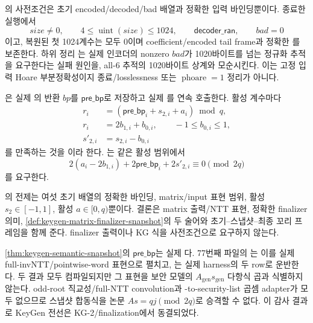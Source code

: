 \begin{verified}
\label{thm:fixed-zero-hbz-success}
의 사전조건은 초기
encoded/decoded/bad 배열과 정확한
 입력 바인딩뿐이다. 종료한 실행에서
\[
  size\ne0,\qquad 4\le\operatorname{uint}(size)\le1024,\qquad
  \mathsf{decoder\_ran},\qquad bad=0
\]
이고, 복원된 첫 1024계수는 모두 0이며 coefficient/encoded tail frame과
정확한 를 보존한다. 하위 정리
는 실제 인코더의 nonzero
\(bad\)가 1020바이트를 넘는 정규화 추적을 요구한다는 실패 원인을, all-6
추적의 1020바이트 상계와 모순시킨다. 이는 고정 입력 Hoare 부분정확성이지
종료/losslessness 또는 \(\operatorname{phoare}=1\) 정리가 아니다.
\end{verified}

\begin{definition}
\label{def:keygen-matrix-finalizer-snapshot}
은 실제
의 반환 \(bp\)를 \(\mathsf{pre\_bp}\)로 저장하고
실제 를 연속 호출한다. 활성 계수마다
\[
\begin{aligned}
  r_i&=(\mathsf{pre\_bp}_i+s_{2,i}+a_i)\bmod q,\\
  r_i&=2b_{1,i}+b_{0,i},\qquad -1\le b_{0,i}\le1,\\
  s'_{2,i}&=s_{2,i}-b_{0,i}
\end{aligned}
\]
를 만족하는 것을
이라 한다.
는 같은 활성 범위에서
\[
  2(a_i-2b_{1,i})+
  2\mathsf{pre\_bp}_i+2s'_{2,i}\equiv0\pmod{2q}
\]
를 요구한다.
\end{definition}

\begin{verified}
\label{thm:keygen-semantic-snapshot}
의 전제는 여섯 초기
배열의 정확한 바인딩, matrix/input 표현 범위, 활성 \(s_2\in[-1,1]\), 활성
\(a\in[0,q)\)뿐이다. 결론은 matrix 출력/NTT 표현, 정확한 finalizer 의미,
\cref{def:keygen-matrix-finalizer-snapshot}의 두 술어와 초기--스냅샷--최종
꼬리 프레임을 함께 준다. finalizer 출력이나 KG 식을 사전조건으로 요구하지
않는다.
\end{verified}

\begin{boundary}
\label{bdry:keygen-ntt-mul}
\cref{thm:keygen-semantic-snapshot}의 \(\mathsf{pre\_bp}\)는 실제
다. 77번째 파일의
는 이를 실제
full-invNTT/pointwise-word 표현으로 펼치고,
는 실제 harness의 두 row로
운반한다. 두 결과 모두 컴파일되지만 그 표현을 보안 모델의
\(A_{\mathrm{gen}}s_{\mathrm{gen}}\) 다항식 곱과 식별하지 않는다. odd-root
직교성/full-NTT convolution과 -to-security-list 곱셈
adapter가 모두 없으므로 스냅샷 합동식을 논문 \(As=qj\pmod{2q}\)로 승격할 수
없다. 이 감사 결과로 KeyGen 전선은 KG-2/finalization에서 동결되었다.
\end{boundary}

